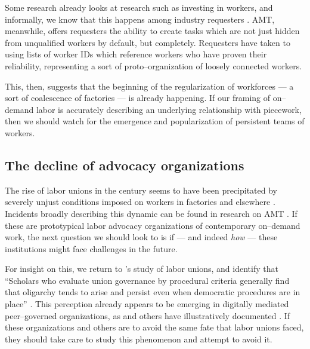 \documentclass{sigchi}
\begin{document}
Some research already looks at research such as investing in workers, and
informally, we know that this happens among industry requesters
\cite{jonBrelig,shepherdingDow}.
AMT, meanwhile, offers requesters the ability to create tasks which are
not just hidden from unqualified workers by default, but completely.
Requesters have taken to using lists of worker IDs which reference
workers who have proven their reliability,
representing a sort of proto--organization of loosely connected workers.

This, then, suggests that the beginning of the regularization of workforces
--- a sort of coalescence of factories ---
is already happening.
If our framing of on--demand labor is accurately describing an underlying relationship with piecework,
then we should watch for the emergence and popularization of persistent teams of workers.

\subsection{The decline of advocacy organizations}
The rise of labor unions in the  century seems to have been precipitated by
severely unjust conditions imposed on workers in factories and elsewhere
\cite{ebbinghaus1999institutions}.
Incidents broadly describing this dynamic can be found in research on AMT
\cite{turkopticon,dynamo}.
If these are prototypical labor advocacy organizations of contemporary on--demand work,
the next question we should look to is if
--- and indeed \textit{how} ---
these institutions might face challenges in the future.

For insight on this, we return to \citeauthor{levi2009union}'s study of labor unions,
and identify that
``Scholars who evaluate union governance by procedural criteria generally find that oligarchy tends to arise and persist even when democratic procedures are in place''
\cite{levi2009union}.
This perception already appears to be emerging in digitally mediated peer--governed organizations,
as \citeauthor{keegan2010egalitarians} and others have illustratively documented
\cite{beschastnikh2008wikipedian,keegan2010egalitarians}.
If these organizations and others are to avoid the same fate that labor unions faced,
they should take care to study this phenomenon and attempt to avoid it.
\end{document}
